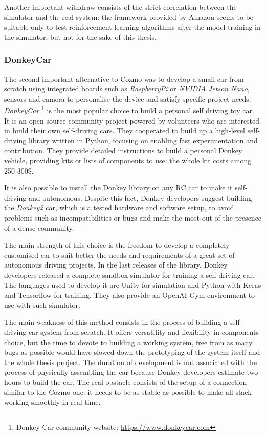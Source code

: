 Another important withdraw consists of the strict correlation between the simulator and the real system: the framework provided by Amazon seems to be suitable only to test reinforcement learning algorithms after the model training in the simulator, but not for the sake of this thesis.

\subsubsection{Donkey\textregistered Car}

The second important alternative to Cozmo was to develop a small car from scratch using integrated boards such as \textit{RaspberryPi} or \textit{NVIDIA Jetson Nano}, sensors and camera to personalise the device and satisfy specific project needs.
\textit{Donkey\textregistered Car} \footnote{Donkey Car community website: \href{https://www.donkeycar.com}{https://www.donkeycar.com}} is the most popular choice to build a personal self driving toy car.
It is an open-source community project powered by volunteers who are interested in build their own self-driving cars.
They cooperated to build up a high-level self-driving library written in Python, focusing on enabling fast experimentation and contribution.
They provide detailed instructions to build a personal Donkey vehicle, providing kits or lists of components to use: the whole kit costs among 250-300\$.

It is also possible to install the Donkey library on any RC car to make it self-driving and autonomous.
Despite this fact, Donkey developers suggest building the \textit{Donkey2} car, which is a tested hardware and software setup, to avoid problems such as incompatibilities or bugs and make the most out of the presence of a dense community.

The main strength of this choice is the freedom to develop a completely customised car to suit better the needs and requirements of a great set of autonomous driving projects.
In the last releases of the library, Donkey developers released a complete sandbox simulator for training a self-driving car.
The languages used to develop it are Unity for simulation and Python with Keras and Tensorflow for training.
They also provide an OpenAI Gym environment to use with such simulator.

The main weakness of this method consists in the process of building a self-driving car system from scratch.
It offers versatility and flexibility in components choice, but the time to devote to building a working system, free from as many bugs as possible would have slowed down the prototyping of the system itself and the whole thesis project.
The duration of development is not associated with the process of physically assembling the car because Donkey developers estimate two hours to build the car.
The real obstacle consists of the setup of a connection similar to the Cozmo one: it needs to be as stable as possible to make all stack working smoothly in real-time.


